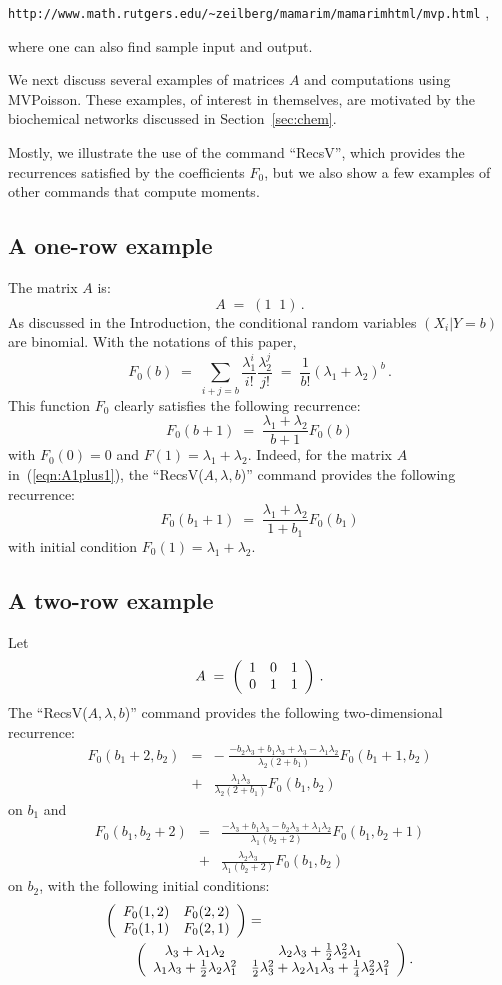 \documentclass[11pt]{article}
\newcommand{\be}[1]{\begin{equation}\label{#1}}
\newcommand{\ee}{\end{equation}}
\newcommand{\beqn}{\begin{eqnarray*}}
\newcommand{\eeqn}{\end{eqnarray*}}
\newcommand{\oneh}{\frac{1}{2}}
\newcommand{\oneq}{\frac{1}{4}}
\newcommand{\mypmatrix}[1]{\left(\begin{array}{cccccccccccc}#1\end{array}\right)}
\begin{document}
{\tt http://www.math.rutgers.edu/\~{}zeilberg/mamarim/mamarimhtml/mvp.html} \quad ,

where one can also find sample input and output.

We next discuss several examples of matrices $A$ and computations using
MVPoisson.  These examples, of interest in themselves, are motivated by the
biochemical networks discussed in Section~\ref{sec:chem}.

Mostly, we illustrate the use of the command ``RecsV'', which provides the
recurrences satisfied by the coefficients $F_0$, but we also show a few
examples of other commands that compute moments.

\subsection{A one-row example}

The matrix $A$ is:
\be{eqn:A1plus1}
A \;=\; (1\;\;1)\,.
\ee
As discussed in the Introduction, the conditional random variables $(X_i|Y=b)$
are binomial.
With the notations of this paper,
\[
F_0(b) \;=\; \sum_{i+j=b} \frac{\lambda _1^i}{i!} \frac{\lambda _2^j}{j!}
        \;=\; \frac{1}{b!} (\lambda _1 + \lambda _2)^b \,.
\]
This function $F_0$ clearly satisfies the following recurrence:
\[
F_0(b+1) \;=\; \frac{\lambda _1+\lambda _2}{b+1} F_0(b)
\]
with $F_0(0)=0$ and $F(1)=\lambda _1+\lambda _2$.
Indeed, for the matrix $A$ in~(\ref{eqn:A1plus1}),
the ``RecsV($A, \lambda , b$)'' command provides the following recurrence:
\[
F_0(b_1+1) \;=\; \frac{\lambda _1+\lambda _2}{1+b_1}F_0(b_1)
\]
with initial condition $F_0(1) = \lambda _1+\lambda _2$.

\subsection{A two-row example}

Let
\be{eqn:Abimolecular}
A\;=\;\mypmatrix{1 & 0 & 1\cr
0 & 1 & 1}\,.
\ee
The ``RecsV($A, \lambda , b$)'' command provides the following two-dimensional
recurrence:
\beqn
F_0(b_1+2, b_2)
&=& 
-\;\frac{-b_2 \lambda _3 + b_1 \lambda _3 + \lambda _3 - \lambda _1 \lambda _2}{\lambda _2 (2 +b_1)}F_0(b_1+1, b_2)
\\
&+&\frac{\lambda _1 \lambda _3 }{\lambda _2 (2 + b_1)}F_0(b_1, b_2)
\eeqn
on $b_1$ and
\beqn
F_0(b_1, b_2 + 2)
&=&\frac{-\lambda _3 + b_1 \lambda _3 - b_2 \lambda _3 + \lambda _1 \lambda _2}{\lambda _1 (b_2 + 2)}F_0(b_1, b_2 + 1)
\\
&+&
\frac{\lambda _2 \lambda _3 }{\lambda _1 (b_2 + 2)}F_0(b_1, b_2)
\eeqn
on $b_2$,
with the following initial conditions:
\beqn
\mypmatrix{
F_0(1,2) & F_0(2,2)\cr
F_0(1,1) & F_0(2,1)}
&=&
\\
&&
\hspace{-100pt}
\mypmatrix{\lambda _3+\lambda _1\lambda _2 & \lambda _2\lambda _3+\oneh\lambda _2^2\lambda _1\cr
\lambda _1\lambda _3+\oneh\lambda _2\lambda _1^2 & \oneh\lambda _3^2+\lambda _2\lambda _1\lambda _3+\oneq\lambda _2^2\lambda _1^2}.
\eeqn
\end{document}
